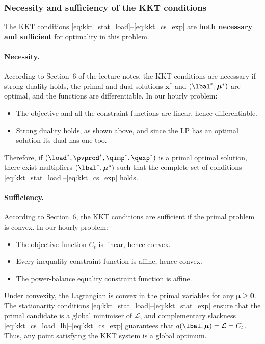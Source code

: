 \subsubsection{Necessity and sufficiency of the KKT conditions}
The KKT conditions \eqref{eq:kkt_stat_load}--\eqref{eq:kkt_cs_exp} are \textbf{both necessary
and sufficient} for optimality in this problem.

\paragraph{Necessity.}
According to Section~6 of the lecture notes, the KKT conditions are necessary if strong
duality holds, the primal and dual solutions ${\mathbf{x}}^*$ and $({\lbal}^*, \boldsymbol{\mu}^*)$ are
optimal, and the functions are differentiable. In our hourly problem:
\begin{itemize}
    \item The objective and all the constraint functions are linear, hence differentiable.
    \item Strong duality holds, as shown above, and since the LP has an optimal solution its
    dual has one too.
\end{itemize}
Therefore, if $({\load}^*, {\pvprod}^*, {\qimp}^*, {\qexp}^*)$ is a primal optimal solution, there
exist multipliers $({\lbal}^*, \boldsymbol{\mu}^*)$ such that the complete set of conditions
\eqref{eq:kkt_stat_load}--\eqref{eq:kkt_cs_exp} holds.

\paragraph{Sufficiency.}
According to Section~6, the KKT conditions are sufficient if the primal problem is convex. In
our hourly problem:
\begin{itemize}
    \item The objective function $C_t$ is linear, hence convex.
    \item Every inequality constraint function is affine, hence convex.
    \item The power-balance equality constraint function is affine.
\end{itemize}
Under convexity, the Lagrangian is convex in the primal variables for any
$\boldsymbol{\mu} \geq \mathbf{0}$. The stationarity conditions
\eqref{eq:kkt_stat_load}--\eqref{eq:kkt_stat_exp} ensure that the primal candidate is a global
minimiser of $\mathcal{L}$, and complementary slackness
\eqref{eq:kkt_cs_load_lb}--\eqref{eq:kkt_cs_exp} guarantees that $q(\lbal, \boldsymbol{\mu}) =
\mathcal{L} = C_t$. Thus, any point satisfying the KKT system is a global optimum.

